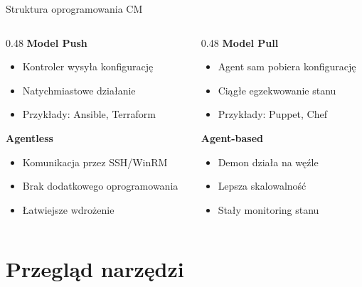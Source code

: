 \documentclass{beamer}
\begin{document}
\begin{frame}{Struktura oprogramowania CM}
    \begin{columns}[T]
        \begin{column}{0.48\textwidth}
            \textbf{Model Push}
            \begin{itemize}
                \item Kontroler wysy\l{}a konfiguracj\k{e}
                \item Natychmiastowe dzia\l{}anie
                \item Przyk\l{}ady: Ansible, Terraform
            \end{itemize}
            \vspace{0.5em}
            \textbf{Agentless}
            \begin{itemize}
                \item Komunikacja przez SSH/WinRM
                \item Brak dodatkowego oprogramowania
                \item \L{}atwiejsze wdro\.zenie
            \end{itemize}
        \end{column}
        \begin{column}{0.48\textwidth}
            \textbf{Model Pull}
            \begin{itemize}
                \item Agent sam pobiera konfiguracj\k{e}
                \item Ci\k{a}g\l{}e egzekwowanie stanu
                \item Przyk\l{}ady: Puppet, Chef
            \end{itemize}
            \vspace{0.5em}
            \textbf{Agent-based}
            \begin{itemize}
                \item Demon dzia\l{}a na w\k{e}\'zle
                \item Lepsza skalowalno\'s\'c
                \item Sta\l{}y monitoring stanu
            \end{itemize}
        \end{column}
    \end{columns}
\end{frame}

\section{Przegl\k{a}d narz\k{e}dzi}
\end{document}
